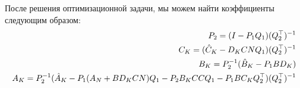 После решения оптимизационной задачи, мы можем найти коэффициенты следующим образом:
\begin{align}
	{P}_{2} = ({I}-{P}_{1}{Q}_{1})({Q}_{2}^\top)^{-1}\\
	{C}_K = ({\hat{C}}_K - {D}_K {C} {N} {Q}_{1} ) ({Q}_{2}^\top)^{-1}\\
	{B}_K = {P}_{2}^{-1}({\hat{B}}_K- {P}_{1}{B}{D}_K)\\
	{A}_K = {P}_{2}^{-1}({\hat{A}}_K-{P}_{1}({A}_N+{B}{D}_K{C}{N}){Q}_{1} - {P}_{2}{B}_K{C}{C}{Q}_{1}-{P}_{1} {B}{C}_K{Q}_{2}^\top)({Q}_{2}^\top)^{-1}
\end{align}
\clearpage
